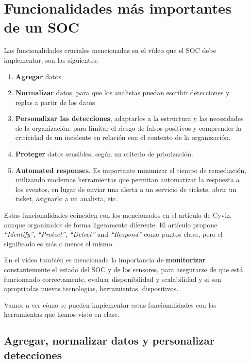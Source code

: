 \section{Funcionalidades más importantes de un SOC}


{Las funcionalidades cruciales mencionadas en el vídeo que el SOC debe implementar, son las siguientes:\ns
\begin{enumerate}
   \item \textbf{Agregar} datos
   \item \textbf{Normalizar} datos, para que los analistas puedan escribir detecciones y reglas a partir de los datos
   \item \textbf{Personalizar las detecciones}, adaptarlos a la estructura y las necesidades de la organización, para limitar el riesgo de falsos positivos y comprender la criticidad de un incidente en relación con el contexto de la organización.
   \item \textbf{Proteger} datos sensibles, según un criterio de priorización.
   \item\textbf{Automated responses}. Es importante minimizar el tiempo de remediación, utilizando modernas herramientas que permitan automatizar la respuesta a los eventos, en lugar de enviar una alerta a un servicio de tickets, abrir un ticket, asignarlo a un analista, etc. 
\end{enumerate}
}

Estas funcionalidades coinciden con los mencionados en el artículo de Cyviz, aunque organizados de forma ligeramente diferente.
El artículo propone \textit{``Identify'',} \textit{``Protect'',} \textit{``Detect''} and \textit{``Respond''} como puntos clave, pero el significado es más o menos el mismo.


En el video también es mencionada la importancia de \textbf{monitorizar} constantemente el estado del SOC y de los sensores, para asegurarse de que está funcionando correctamente, evaluar disponibilidad y scalabilidad y si son apropriadas nuevas tecnologías, herramientas, dispositivos.


Vamos a ver cómo se pueden implementar estas funcionalidades con las herramientas que hemos visto en clase.
\subsection{Agregar, normalizar datos y personalizar detecciones}

   
